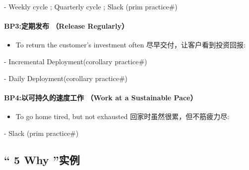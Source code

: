 \begin{description}
\tightlist
\item[]
- Weekly cycle ; Quarterly cycle ; Slack (prim practice\#)
\end{description}

\hypertarget{bp3ux5b9aux671fux53d1ux5e03-release-regularly}{%
\paragraph{BP3:定期发布 （Release
Regularly）}\label{bp3ux5b9aux671fux53d1ux5e03-release-regularly}}

\begin{itemize}
\tightlist
\item
  To return the customer's investment often
  尽早交付，让客户看到投资回报:
\end{itemize}

\begin{description}
\tightlist
\item[]
- Incremental Deployment(corollary practice\#)

- Daily Deployment(corollary practice\#)
\end{description}

\hypertarget{bp4ux4ee5ux53efux6301ux4e45ux7684ux901fux5ea6ux5de5ux4f5c-work-at-a-sustainable-pace}{%
\paragraph{BP4:以可持久的速度工作 （Work at a Sustainable
Pace）}\label{bp4ux4ee5ux53efux6301ux4e45ux7684ux901fux5ea6ux5de5ux4f5c-work-at-a-sustainable-pace}}

\begin{itemize}
\tightlist
\item
  To go home tired, but not exhausted 回家时虽然很累，但不筋疲力尽:\\
\end{itemize}

\begin{description}
\tightlist
\item[]
- Slack (prim practice\#)
\end{description}

\hypertarget{why-ux5b9eux4f8b}{%
\subsection{`` 5 Why ''实例}\label{why-ux5b9eux4f8b}}

